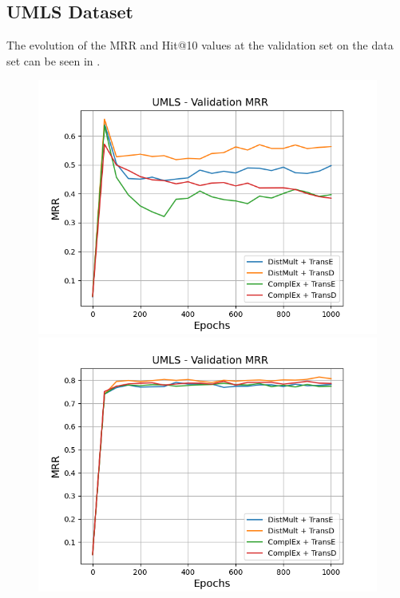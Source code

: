 \subsection{UMLS Dataset}
\label{subsec:methods_umls}

The evolution of the MRR and Hit@10 values at the validation set on the \umls data set can be seen in .
\begin{figure}
    \centering
    \begin{minipage}{.5\textwidth}
      \centering
      \includegraphics[width=0.9\linewidth]{figures/results/gan_train/not_pretrained/uncertainty/max/entropy/umls/uncertainty_umls_mrrs.png}
    \end{minipage}%
    \begin{minipage}{.5\textwidth}
      \centering
      \includegraphics[width=0.9\linewidth]{figures/results/gan_train/not_pretrained/uncertainty/max_distribution/entropy/umls/uncertainty_umls_mrrs.png}

\end{minipage}
\end{figure}
